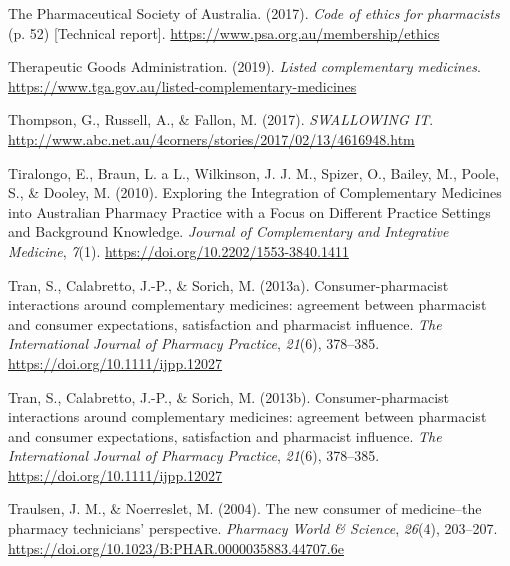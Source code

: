\documentclass[12pt,]{article}
\begin{document}
\hypertarget{ref-PSA2017}{}
The Pharmaceutical Society of Australia. (2017). \emph{Code of ethics
for pharmacists} (p. 52) {[}Technical report{]}.
\url{https://www.psa.org.au/membership/ethics}

\hypertarget{ref-TGA2019_listed}{}
Therapeutic Goods Administration. (2019). \emph{Listed complementary
medicines}. \url{https://www.tga.gov.au/listed-complementary-medicines}

\hypertarget{ref-Thompson2017}{}
Thompson, G., Russell, A., \& Fallon, M. (2017). \emph{SWALLOWING IT}.
\url{http://www.abc.net.au/4corners/stories/2017/02/13/4616948.htm}

\hypertarget{ref-Tiralongo2010}{}
Tiralongo, E., Braun, L. a L., Wilkinson, J. J. M., Spizer, O., Bailey,
M., Poole, S., \& Dooley, M. (2010). Exploring the Integration of
Complementary Medicines into Australian Pharmacy Practice with a Focus
on Different Practice Settings and Background Knowledge. \emph{Journal
of Complementary and Integrative Medicine}, \emph{7}(1).
\url{https://doi.org/10.2202/1553-3840.1411}

\hypertarget{ref-Tran2013}{}
Tran, S., Calabretto, J.-P., \& Sorich, M. (2013a). Consumer-pharmacist
interactions around complementary medicines: agreement between
pharmacist and consumer expectations, satisfaction and pharmacist
influence. \emph{The International Journal of Pharmacy Practice},
\emph{21}(6), 378--385. \url{https://doi.org/10.1111/ijpp.12027}

\hypertarget{ref-Tran:2013kh}{}
Tran, S., Calabretto, J.-P., \& Sorich, M. (2013b). Consumer-pharmacist
interactions around complementary medicines: agreement between
pharmacist and consumer expectations, satisfaction and pharmacist
influence. \emph{The International Journal of Pharmacy Practice},
\emph{21}(6), 378--385. \url{https://doi.org/10.1111/ijpp.12027}

\hypertarget{ref-Traulsen2004}{}
Traulsen, J. M., \& Noerreslet, M. (2004). The new consumer of
medicine--the pharmacy technicians' perspective. \emph{Pharmacy World \&
Science}, \emph{26}(4), 203--207.
\url{https://doi.org/10.1023/B:PHAR.0000035883.44707.6e}
\end{document}
